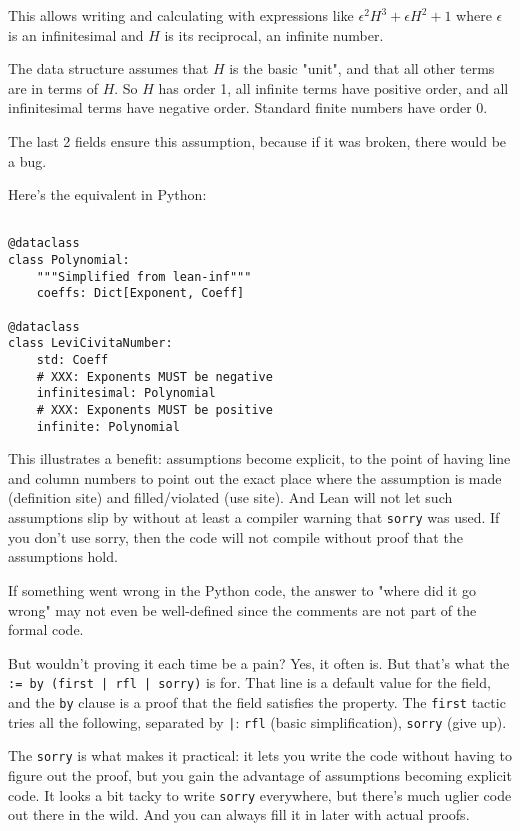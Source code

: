 \documentclass{article}
\begin{document}
This allows writing and calculating with expressions like $\epsilon^2 H^3 + \epsilon H^2 + 1$ where $\epsilon$ is an infinitesimal and $H$ is its reciprocal, an infinite number.

The data structure assumes that $H$ is the basic "unit", and that all other terms are in terms of $H$. So $H$ has order 1, all infinite terms have positive order, and all infinitesimal terms have negative order. Standard finite numbers have order 0.

The last 2 fields ensure this assumption, because if it was broken, there would be a bug.

Here's the equivalent in Python:

\begin{verbatim}

@dataclass
class Polynomial:
    """Simplified from lean-inf"""
    coeffs: Dict[Exponent, Coeff]

@dataclass
class LeviCivitaNumber:
    std: Coeff
    # XXX: Exponents MUST be negative
    infinitesimal: Polynomial
    # XXX: Exponents MUST be positive
    infinite: Polynomial
\end{verbatim}

This illustrates a benefit: assumptions become explicit, to the point of having line and column numbers to point out the exact place where the assumption is made (definition site) and filled/violated (use site). And Lean will not let such assumptions slip by without at least a compiler warning that \texttt{sorry} was used. If you don't use sorry, then the code will not compile without proof that the assumptions hold.

If something went wrong in the Python code, the answer to "where did it go wrong" may not even be well-defined since the comments are not part of the formal code.

But wouldn't proving it each time be a pain? Yes, it often is. But that's what the \texttt{:= by (first | rfl | sorry)} is for. That line is a default value for the field, and the \texttt{by} clause is a proof that the field satisfies the property. The \texttt{first} tactic tries all the following, separated by \texttt{|}: \texttt{rfl} (basic simplification), \texttt{sorry} (give up).

The \texttt{sorry} is what makes it practical: it lets you write the code without having to figure out the proof, but you gain the advantage of assumptions becoming explicit code. It looks a bit tacky to write \texttt{sorry} everywhere, but there's much uglier code out there in the wild. And you can always fill it in later with actual proofs.
\end{document}
